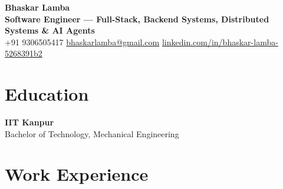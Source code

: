 \documentclass[10pt,a4paper]{article}
\begin{document}
\begin{center}
    {\LARGE\bfseries Bhaskar Lamba}\\[4pt]
    {\small\color{primary}\bfseries Software Engineer --- Full-Stack, Backend Systems, Distributed Systems \& AI Agents}\\[3pt]
    \small
    +91 9306505417 \quad\textbar\quad
    \href{mailto:bhaskarlamba@gmail.com}{bhaskarlamba@gmail.com} \quad\textbar\quad
    \href{https://www.linkedin.com/in/bhaskar-lamba-5268391b2/}{linkedin.com/in/bhaskar-lamba-5268391b2}
\end{center}
\vspace{6pt}

\section{Education}
\small
\textbf{IIT Kanpur} \hfill {}\\
Bachelor of Technology, Mechanical Engineering

\section{Work Experience}
\small
\end{document}
